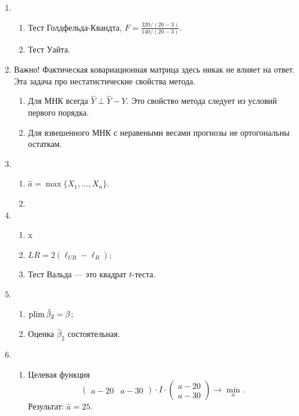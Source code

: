\begin{enumerate}
    \item 
    \begin{enumerate}
        \item Тест Голдфельда-Квандта, $F=\frac{320/(20-3)}{140/(20-3)}$.
        \item Тест Уайта.
    \end{enumerate}
    \item Важно! Фактическая ковариационная матрица здесь никак не влияет на ответ. 
    Эта задача про нестатистические свойства метода. 
    \begin{enumerate}
        \item Для МНК всегда $\hat Y \perp \hat Y - Y$. Это свойство метода следует из условий первого порядка. 
        \item Для взвешенного МНК с неравеными весами прогнозы не ортогональны остаткам. 
    \end{enumerate}
    \item 
    \begin{enumerate}
        \item $\hat a = \max \{X_1, \ldots, X_n\}$.
        \item 
    \end{enumerate}
    \item 
    \begin{enumerate}
        \item x
        \item $LR = 2(\ell_{UR} - \ell_R)$;
        \item Тест Вальда — это квадрат $t$-теста.
    \end{enumerate}
    \item 
    \begin{enumerate}
        \item $\operatorname*{plim} \hat\beta_2 = \beta$;
        \item Оценка $\hat\beta_2$ состоятельная.
    \end{enumerate}
    \item 
    \begin{enumerate}
        \item Целевая функция
        \[
        \begin{pmatrix} a - 20 & a - 30 \end{pmatrix} \cdot I \cdot \begin{pmatrix} a - 20 \\ a - 30 \end{pmatrix} \to \min_a.
        \]
        Результат: $\hat a = 25$.

\end{enumerate}
\end{enumerate}
